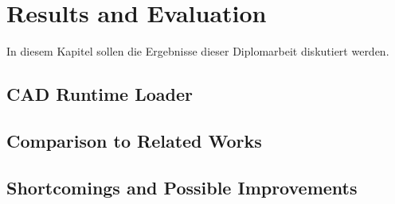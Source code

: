 \chapter{Results and Evaluation}\label{chp:Results}
In diesem Kapitel sollen die Ergebnisse dieser Diplomarbeit diskutiert werden. 
\section{CAD Runtime Loader}

\section{Comparison to Related Works}

\section{Shortcomings and Possible Improvements}
